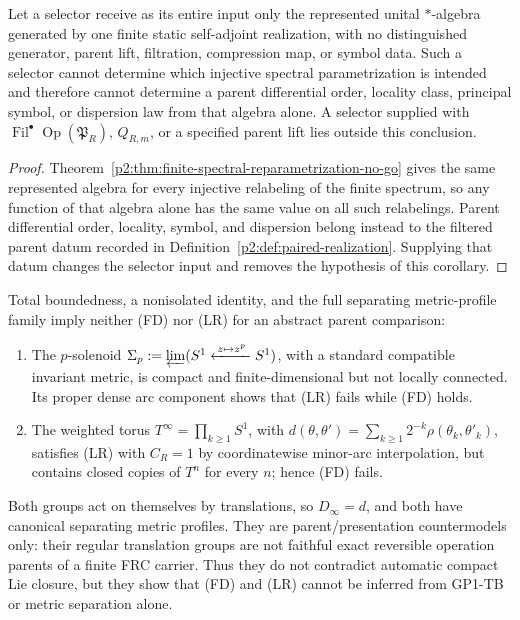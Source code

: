 \documentclass[11pt,a4paper]{article}
\begin{document}
\begin{corollary}
\label{p2:cor:static-algebra-selector-boundary}
Let a selector receive as its entire input only the represented unital
\(*\)-algebra generated by one finite static self-adjoint realization, with no
distinguished generator, parent lift, filtration, compression map, or symbol
data.  Such a selector cannot determine which injective spectral
parametrization is intended and therefore cannot determine a parent
differential order, locality class, principal symbol, or dispersion law from
that algebra alone.  A selector supplied with
\(\operatorname{Fil}^{\bullet}\operatorname{Op}(\mathfrak P_R)\),
\(Q_{R,m}\), or a specified parent lift lies outside this conclusion.
\end{corollary}

\begin{proof}
Theorem~\ref{p2:thm:finite-spectral-reparametrization-no-go} gives the same
represented algebra for every injective relabeling of the finite spectrum, so
any function of that algebra alone has the same value on all such relabelings.
Parent differential order, locality, symbol, and dispersion belong instead to
the filtered parent datum recorded in
Definition~\ref{p2:def:paired-realization}.  Supplying that datum changes the
selector input and removes the hypothesis of this corollary.
\end{proof}


\begin{proposition}
\label{p2:prop:gp1-clause-sharpness}
Total boundedness, a nonisolated identity, and the full separating
metric-profile family imply neither (FD) nor (LR) for an abstract parent
comparison:
\begin{enumerate}[label=(\roman*), leftmargin=2em]
\item The \(p\)-solenoid
\(\Sigma_p:=\varprojlim(S^1\xleftarrow{\,z\mapsto z^p\,}S^1)\), with a
standard compatible invariant metric, is compact and finite-dimensional but
not locally connected.  Its proper dense arc component shows that (LR) fails
while (FD) holds.
\item The weighted torus
\(T^\infty=\prod_{k\ge1}S^1\), with
\(d(\theta,\theta')=\sum_{k\ge1}2^{-k}\rho(\theta_k,\theta'_k)\), satisfies
(LR) with \(C_R=1\) by coordinatewise minor-arc interpolation, but contains
closed copies of \(T^n\) for every \(n\); hence (FD) fails.
\end{enumerate}
Both groups act on themselves by translations, so \(D_\infty=d\), and both
have canonical separating metric profiles.  They are parent/presentation
countermodels only: their regular translation groups are not faithful exact
reversible operation parents of a finite FRC carrier.  Thus they do not
contradict automatic compact Lie closure, but they show that (FD) and (LR)
cannot be inferred from GP1-TB or metric separation alone.
\end{proposition}
\end{document}
